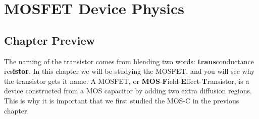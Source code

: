 \chapter{MOSFET Device Physics}
\label{ch:ch08_mos}
\graphicspath{{./figs_mos/}}
\section{Chapter Preview}
The naming of the transistor comes from blending two words: \textbf{trans}conductance res\textbf{istor}.  In this chapter we will be studying the MOSFET, and you will see why the transistor gets it name.  A MOSFET, or \textbf{MOS}-\textbf{F}ield-\textbf{E}ffect-\textbf{T}ransistor, is a device constructed from a MOS capacitor by adding two extra diffusion regions.  This is why it is important that we first studied the MOS-C in the previous chapter.

